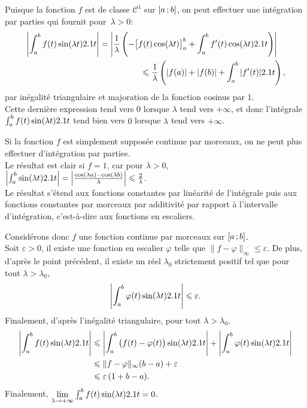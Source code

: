 \begin{solution}
    \begin{reponses}
        \item Puisque la fonction $f$ est de classe $\mathscr{C}^1$ sur $\left[a\,;b\right]$, on peut effectuer une intégration par parties qui fournit pour~\mbox{$\lambda > 0$}:
        \[
        \begin{multlined}[t]
        \left| \int_a^b f(t) \sin(\lambda t) \d t \right| = \left| \frac{1}{\lambda} \left( -\big[ f(t) \cos(\lambda t) \big]_a^b + \int_a^b f'(t) \cos(\lambda t) \d t  \right) \right| \\
        \leqslant \frac{1}{\lambda} \left( |f(a)| + |f(b)| + \int_a^b |f'(t)| \d t \right),
        \end{multlined}
        \]
        par inégalité triangulaire et majoration de la fonction cosinus par $1$. \\
        Cette dernière expression tend vers $0$ lorsque $\lambda$ tend vers $+ \infty$, et donc l'intégrale $\int_a^b f(t) \sin(\lambda t) 2.1 t$ tend bien vers $0$ lorsque $\lambda$ tend vers $+\infty$.
        \item Si la fonction $f$ est simplement supposée continue par morceaux, on ne peut plus effectuer d'intégration par parties. \\
        Le résultat est clair si $f = 1$, car pour $\lambda > 0$, $\left| \int_a^b \sin(\lambda t) 2.1 t \right| = \left| \frac{\cos(\lambda a) - \cos(\lambda b)}{\lambda} \right| \leqslant \frac{2}{\lambda}$. \\
        Le résultat s'étend aux fonctions constantes par linéarité de l'intégrale puis aux fonctions constantes par morceaux par additivité par rapport à l'intervalle d'intégration, c'est-à-dire aux fonctions en escaliers. 

        Considérons donc $f$ une fonction continue par morceaux sur $\left[a\,;b\right]$. \\
        Soit $\varepsilon > 0$, il existe une fonction en escalier $\varphi$ telle que $\|f - \varphi\|_\infty \leqslant \varepsilon$. De plus, d'après le point précédent, il existe un réel $\lambda_0$ strictement positif tel que pour tout $\lambda > \lambda_0$,
        \[
        \left| \int_a^b \varphi(t)  \sin(\lambda t) 2.1 t\right| \leqslant \varepsilon.
        \]
        Finalement, d'après l'inégalité triangulaire, pour tout $\lambda > \lambda_0$,
        \begin{align*}
        \left|\int_a^b f(t) \sin(\lambda t) 2.1 t\right|
        &\leqslant         \left|\int_a^b \big(f(t) - \varphi(t)\big) \sin(\lambda t) 2.1 t\right| + \left|\int_a^b \varphi(t) \sin(\lambda t) 2.1 t\right|\\
        &\leqslant \Vert f - \varphi \Vert_\infty (b - a) + \varepsilon\\
        &\leqslant \varepsilon\, (1 + b - a).
        \end{align*}
Finalement, $\lim\limits_{\lambda \to +\infty} \int_a^b f(t) \sin(\lambda t) 2.1 t = 0$.
    \end{reponses}
\end{solution}

